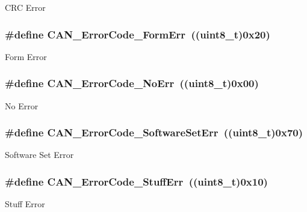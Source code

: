 \label{group__CAN__Error__Code__constants_gafa75157442dba7ba1a91036242b78e92}
CRC Error \hypertarget{group__CAN__Error__Code__constants_ga1fe585558bb8d5c834b4266661392cb2}{
\subsubsection[{CAN\_\-ErrorCode\_\-FormErr}]{\setlength{\rightskip}{0pt plus 5cm}\#define CAN\_\-ErrorCode\_\-FormErr~((uint8\_\-t)0x20)}}
\label{group__CAN__Error__Code__constants_ga1fe585558bb8d5c834b4266661392cb2}
Form Error \hypertarget{group__CAN__Error__Code__constants_ga025d891e9c5cec2cfecb2213b4f74a9e}{
\subsubsection[{CAN\_\-ErrorCode\_\-NoErr}]{\setlength{\rightskip}{0pt plus 5cm}\#define CAN\_\-ErrorCode\_\-NoErr~((uint8\_\-t)0x00)}}
\label{group__CAN__Error__Code__constants_ga025d891e9c5cec2cfecb2213b4f74a9e}
No Error \hypertarget{group__CAN__Error__Code__constants_ga927089dd74347b9fea7a7c59f3840a7c}{
\subsubsection[{CAN\_\-ErrorCode\_\-SoftwareSetErr}]{\setlength{\rightskip}{0pt plus 5cm}\#define CAN\_\-ErrorCode\_\-SoftwareSetErr~((uint8\_\-t)0x70)}}
\label{group__CAN__Error__Code__constants_ga927089dd74347b9fea7a7c59f3840a7c}
Software Set Error \hypertarget{group__CAN__Error__Code__constants_gaa733d1c078472912c3bf60fbdc53734d}{
\subsubsection[{CAN\_\-ErrorCode\_\-StuffErr}]{\setlength{\rightskip}{0pt plus 5cm}\#define CAN\_\-ErrorCode\_\-StuffErr~((uint8\_\-t)0x10)}}
\label{group__CAN__Error__Code__constants_gaa733d1c078472912c3bf60fbdc53734d}
Stuff Error 
